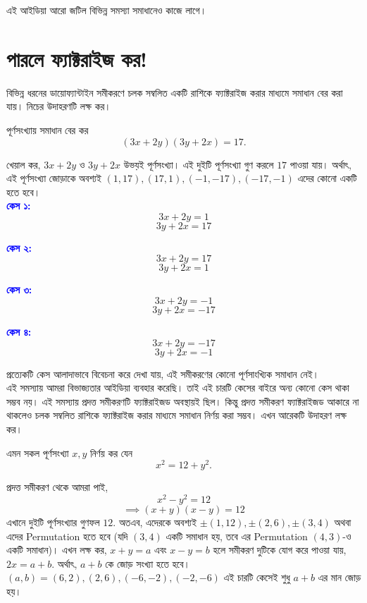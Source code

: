 \documentclass[11pt]{report}
\begin{document}
এই আইডিয়া আরো জটিল বিভিন্ন সমস্যা সমাধানেও কাজে লাগে।\\

\section{পারলে ফ্যাক্টরাইজ কর!}

বিভিন্ন ধরনের ডায়োফ্যান্টাইন সমীকরণে চলক সম্বলিত একটি রাশিকে ফ্যাক্টরাইজ করার মাধ্যমে সমাধান বের করা যায়। নিচের উদাহরণটি লক্ষ কর।\\

\begin{tcolorbox}[colframe=black!80!green,title=উদাহরণ 1.3.1]
পূর্ণসংখ্যায় সমাধান বের কর $$(3x+2y)(3y+2x)=17.$$
\end{tcolorbox}

খেয়াল কর, $3x+2y$ ও $3y+2x$ উভয়ই পূর্ণসংখ্যা। এই দুইটি পূর্ণসংখ্যা গুণ করলে $17$ পাওয়া যায়। অর্থাৎ, এই পূর্ণসংখ্যা জোড়াকে অবশ্যই $(1, 17), (17, 1), (-1, -17), (-17, -1)$ এদের কোনো একটি হতে হবে।\\

\textbf{\textcolor{blue}{কেস ১:}} $$3x+2y=1$$ $$3y+2x=17$$

\textbf{\textcolor{blue}{কেস ২:}} $$3x+2y=17$$ $$3y+2x=1$$

\textbf{\textcolor{blue}{কেস ৩:}} $$3x+2y=-1$$ $$3y+2x=-17$$

\textbf{\textcolor{blue}{কেস ৪:}} $$3x+2y=-17$$ $$3y+2x=-1$$

প্রত্যেকটি কেস আলাদাভাবে বিবেচনা করে দেখা যায়, এই সমীকরণের কোনো পূর্ণসাংখ্যিক সমাধান নেই।\\

এই সমস্যায় আমরা বিভাজ্যতার আইডিয়া ব্যবহার করেছি। তাই এই চারটি কেসের বাইরে অন্য কোনো কেস থাকা সম্ভব নয়। এই সমস্যায় প্রদত্ত সমীকরণটি ফ্যাক্টরাইজড অবস্থায়ই ছিল। কিন্তু প্রদত্ত সমীকরণ ফ্যাক্টরাইজড আকারে না থাকলেও চলক সম্বলিত রাশিকে ফ্যাক্টরাইজ করার মাধ্যমে সমাধান নির্ণয় করা সম্ভব। এখন আরেকটি উদাহরণ লক্ষ কর।\\

\begin{tcolorbox}[colframe=black!80!green,title=উদাহরণ 1.3.2]
এমন সকল পূর্ণসংখ্যা $x, y$ নির্ণয় কর যেন $$x^2=12+y^2.$$
\end{tcolorbox}

প্রদত্ত সমীকরণ থেকে আমরা পাই, $$x^2-y^2=12$$ $$\implies (x+y)(x-y)=12$$
এখানে দুইটি পূর্ণসংখ্যার গুণফল $12.$ অতএব, এদেরকে অবশ্যই $\pm (1, 12), \pm (2, 6), \pm (3, 4)$ অথবা এদের Permutation হতে হবে (যদি $(3, 4)$ একটি সমাধান হয়, তবে এর Permutation $(4, 3)$-ও একটি সমাধান)। এখন লক্ষ কর, $x+y=a$ এবং $x-y=b$ হলে সমীকরণ দুটিকে যোগ করে পাওয়া যায়, $2x = a+b.$ অর্থাৎ, $a+b$ কে জোড় সংখ্যা হতে হবে। $(a,b)=(6,2),(2,6),(-6,-2),(-2,-6)$ এই চারটি কেসেই শুধু $a+b$ এর মান জোড় হয়।\\
\end{document}
